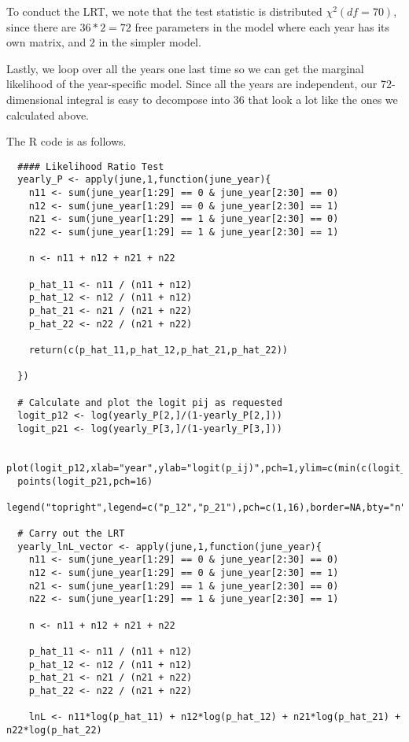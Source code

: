 \documentclass{article} %
\begin{document}
\begin{enumerate}
\begin{enumerate}
To conduct the LRT, we note that the test statistic is distributed $\chi^2(df=70)$, since there are $36*2=72$ free parameters in the model where each year has its own matrix, and $2$ in the simpler model.

Lastly, we loop over all the years one last time so we can get the marginal likelihood of the year-specific model. Since all the years are independent, our 72-dimensional integral is easy to decompose into 36 that look a lot like the ones we calculated above.

The R code is as follows.

\begin{lstlisting}
  #### Likelihood Ratio Test
  yearly_P <- apply(june,1,function(june_year){
    n11 <- sum(june_year[1:29] == 0 & june_year[2:30] == 0)
    n12 <- sum(june_year[1:29] == 0 & june_year[2:30] == 1)
    n21 <- sum(june_year[1:29] == 1 & june_year[2:30] == 0)
    n22 <- sum(june_year[1:29] == 1 & june_year[2:30] == 1)

    n <- n11 + n12 + n21 + n22

    p_hat_11 <- n11 / (n11 + n12)
    p_hat_12 <- n12 / (n11 + n12)
    p_hat_21 <- n21 / (n21 + n22)
    p_hat_22 <- n22 / (n21 + n22)

    return(c(p_hat_11,p_hat_12,p_hat_21,p_hat_22))

  })

  # Calculate and plot the logit pij as requested
  logit_p12 <- log(yearly_P[2,]/(1-yearly_P[2,]))
  logit_p21 <- log(yearly_P[3,]/(1-yearly_P[3,]))

  plot(logit_p12,xlab="year",ylab="logit(p_ij)",pch=1,ylim=c(min(c(logit_p12,logit_p21)),max(c(logit_p12,logit_p21))))
  points(logit_p21,pch=16)
  legend("topright",legend=c("p_12","p_21"),pch=c(1,16),border=NA,bty="n")

  # Carry out the LRT
  yearly_lnL_vector <- apply(june,1,function(june_year){
    n11 <- sum(june_year[1:29] == 0 & june_year[2:30] == 0)
    n12 <- sum(june_year[1:29] == 0 & june_year[2:30] == 1)
    n21 <- sum(june_year[1:29] == 1 & june_year[2:30] == 0)
    n22 <- sum(june_year[1:29] == 1 & june_year[2:30] == 1)

    n <- n11 + n12 + n21 + n22

    p_hat_11 <- n11 / (n11 + n12)
    p_hat_12 <- n12 / (n11 + n12)
    p_hat_21 <- n21 / (n21 + n22)
    p_hat_22 <- n22 / (n21 + n22)

    lnL <- n11*log(p_hat_11) + n12*log(p_hat_12) + n21*log(p_hat_21) + n22*log(p_hat_22)


\end{lstlisting}
\end{enumerate}
\end{enumerate}
\end{document}
